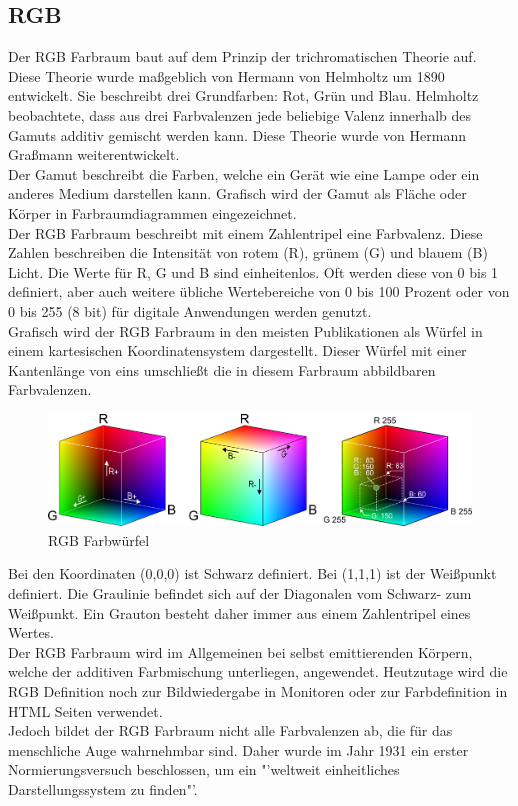 \documentclass[11pt]{scrartcl}
\begin{document}
\subsection{RGB}
Der RGB Farbraum baut auf dem Prinzip der trichromatischen Theorie auf. Diese Theorie wurde maßgeblich von Hermann von Helmholtz um 1890
entwickelt. Sie beschreibt drei Grundfarben: Rot, Grün und Blau. Helmholtz beobachtete, dass aus drei Farbvalenzen jede beliebige Valenz
innerhalb des Gamuts additiv gemischt werden kann. Diese Theorie wurde von Hermann Graßmann weiterentwickelt.\\
Der Gamut beschreibt die Farben, welche ein Gerät wie eine Lampe oder ein anderes Medium darstellen kann. Grafisch wird der Gamut als
Fläche oder Körper in Farbraumdiagrammen eingezeichnet.\\
Der RGB Farbraum beschreibt mit einem Zahlentripel eine Farbvalenz. Diese Zahlen beschreiben die Intensität von rotem (R), grünem (G) und
blauem (B) Licht. Die Werte für R, G und B sind einheitenlos. Oft werden diese von 0 bis 1 definiert, aber auch weitere übliche
Wertebereiche von 0 bis 100 Prozent oder von 0 bis 255 (8 bit) für digitale Anwendungen werden genutzt. \cite{wikipediaRGB}\\
Grafisch wird der RGB Farbraum in den meisten Publikationen als Würfel in einem kartesischen Koordinatensystem dargestellt. Dieser Würfel
mit einer Kantenlänge von eins umschließt die in diesem Farbraum abbildbaren Farbvalenzen.
\begin{figure}[H]
    \includegraphics[width=\textwidth]{images/rgb_color_cube.png}
    \caption[RGB Farbwürfel]{RGB Farbwürfel \cite{wisotopRGB}}
\end{figure}
\noindent
Bei den Koordinaten (0,0,0) ist Schwarz definiert. Bei (1,1,1) ist der Weißpunkt definiert. Die Graulinie befindet sich auf der Diagonalen
vom Schwarz- zum Weißpunkt. Ein Grauton besteht daher immer aus einem Zahlentripel eines Wertes. \cite{wisotopRGB}\\
Der RGB Farbraum wird im Allgemeinen bei selbst emittierenden Körpern, welche der additiven Farbmischung unterliegen, angewendet. Heutzutage
wird die RGB Definition noch zur Bildwiedergabe in Monitoren oder zur Farbdefinition in HTML Seiten verwendet.\\
Jedoch bildet der RGB Farbraum nicht alle Farbvalenzen ab, die für das menschliche Auge wahrnehmbar sind. Daher wurde im Jahr 1931 ein
erster Normierungsversuch beschlossen, um ein "'weltweit einheitliches Darstellungssystem zu finden"'.\\\cite{wikipediaRGB}
\end{document}
